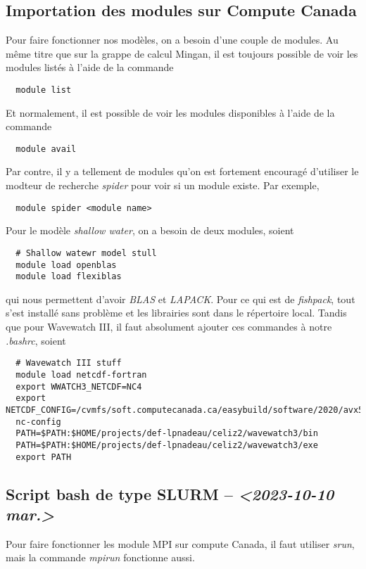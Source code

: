 \documentclass[10pt]{article}
\numberwithin{equation}{section}
\begin{document}
\subsection{Importation des modules sur Compute Canada}
\label{sec:org9ef5775}
Pour faire fonctionner nos modèles, on a besoin d'une couple de modules.
Au même titre que sur la grappe de calcul Mingan, il est toujours possible de voir les modules listés à l'aide de la commande
\begin{verbatim}
  module list
\end{verbatim}
Et normalement, il est possible de voir les modules disponibles à l'aide de la commande
\begin{verbatim}
  module avail
\end{verbatim}
Par contre, il y a tellement de modules qu'on est fortement encouragé d'utiliser le modteur de recherche \emph{spider} pour voir si un module existe.
Par exemple,
\begin{verbatim}
  module spider <module name>
\end{verbatim}

Pour le modèle \emph{shallow water}, on a besoin de deux modules, soient
\begin{verbatim}
  # Shallow watewr model stull
  module load openblas
  module load flexiblas
\end{verbatim}
qui nous permettent d'avoir \emph{BLAS} et \emph{LAPACK}.
Pour ce qui est de \emph{fishpack}, tout s'est installé sans problème et les librairies sont dans le répertoire local.
Tandis que pour Wavewatch III, il faut absolument ajouter ces commandes à notre \emph{.bashrc}, soient 
\begin{verbatim}
  # Wavewatch III stuff                                                                       
  module load netcdf-fortran
  export WWATCH3_NETCDF=NC4
  export NETCDF_CONFIG=/cvmfs/soft.computecanada.ca/easybuild/software/2020/avx512/Compiler/intel2020/netcdf/4.9.0/bin/\
  nc-config
  PATH=$PATH:$HOME/projects/def-lpnadeau/celiz2/wavewatch3/bin
  PATH=$PATH:$HOME/projects/def-lpnadeau/celiz2/wavewatch3/exe
  export PATH
\end{verbatim}


\subsection{Script bash de type SLURM -- \textit{<2023-10-10 mar.>}}
\label{sec:orgfce1895}

Pour faire fonctionner les module MPI sur compute Canada, il faut utiliser \emph{srun}, mais la commande \emph{mpirun} fonctionne aussi.\bigskip
\end{document}
